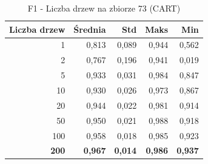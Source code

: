 \begin{table}[htbp]
\centering
\small
\setlength{\tabcolsep}{6pt}
\renewcommand{\arraystretch}{1.2}
\caption{F1 - Liczba drzew na zbiorze 73 (CART)}
\label{tab:CART_tree_count_73_f1}
\begin{tabular}{r|r|r|r|r}
\toprule
Liczba drzew & Średnia & Std & Maks & Min \\
\hline
1 & 0,813 & 0,089 & 0,944 & 0,562 \\
2 & 0,767 & 0,196 & 0,941 & 0,019 \\
5 & 0,933 & 0,031 & 0,984 & 0,847 \\
10 & 0,930 & 0,026 & 0,973 & 0,867 \\
20 & 0,944 & 0,022 & 0,981 & 0,914 \\
50 & 0,950 & 0,021 & 0,988 & 0,918 \\
100 & 0,958 & 0,018 & 0,985 & 0,923 \\
\textbf{200} & \textbf{0,967} & \textbf{0,014} & \textbf{0,986} & \textbf{0,937} \\
\bottomrule
\end{tabular}
\end{table}